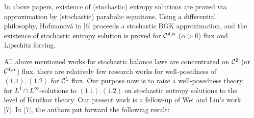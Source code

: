 \documentclass[11pt]{article}
\begin{document}
   \vskip1mm\par
In above  papers, existence of (stochastic) entropy solutions are
proved via approximation by (stochastic) parabolic equations. Using
a differential philosophy, Hofmanov\'{a} in [6] proceeds a
stochastic BGK approximation, and the existence of stochastic
entropy solution is proved for ${\mathcal C}^{4,\alpha}$ ($\alpha>0$) flux
and Lipschitz forcing.
 \vskip1mm\par
All above mentioned works for stochastic balance laws are
concentrated on ${\mathcal C}^2$ (or ${\mathcal C}^{4,\alpha}$) flux, there are
relatively few research works for well-posedness of $(1.1), (1.2)$
for ${\mathcal C}^1$ flux. Our purpose now is to raise a well-posedness
theory for $L^1\cap L^\infty$-solutions to $(1.1). (1.2)$ on
stochastic entropy solutions to the level of Kru\v{z}kov theory. Our
present work is a fellow-up of Wei and Liu's work [7]. In [7], the
authors put forward the following result:
\end{document}
